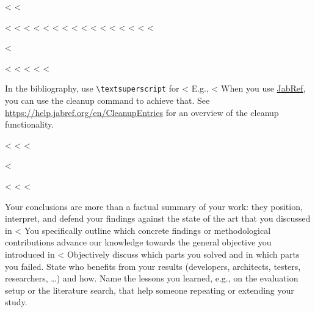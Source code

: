 {{{{<%
<%

<%
<%
<%
<%
<%
<%
<%
<%
<%
<%
<%
<%
<%
<%
<%
<%

<%

<%
<%
<%
<%
<%

In the bibliography, use \texttt{\textbackslash textsuperscript} for <%
E.g., <%
When you use \href{https://www.jabref.org}{JabRef}, you can use the cleanup command to achieve that.
See \url{https://help.jabref.org/en/CleanupEntries} for an overview of the cleanup functionality.

<%
<%
<%

<%

<%
<%
<%

Your conclusions are more than a factual summary of your work: they position, interpret, and defend your findings against the state of the art that you discussed in <%
You specifically outline which concrete findings or methodological contributions advance our knowledge towards the general objective you introduced in <%
Objectively discuss which parts you solved and in which parts you failed.
State who benefits from your results (developers, architects, testers, researchers, \ldots) and how.
Name the lessons you learned, e.g., on the evaluation setup or the literature search, that help someone repeating or extending your study.

}}}}
